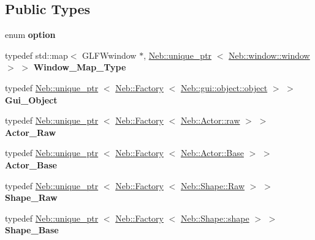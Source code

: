 \subsection*{\-Public \-Types}
\begin{DoxyCompactItemize}
\item 
enum {\bfseries option} 
\item 
\hypertarget{classNeb_1_1master_aeb2db0ac51b05f774e11aa19b9d2ce86}{typedef std\-::map$<$ \-G\-L\-F\-Wwindow \*
$\ast$, \hyperlink{classNeb_1_1unique__ptr}{\-Neb\-::unique\-\_\-ptr}\*
$<$ \hyperlink{classNeb_1_1window_1_1window}{\-Neb\-::window\-::window} $>$ $>$ {\bfseries \-Window\-\_\-\-Map\-\_\-\-Type}}\label{classNeb_1_1master_aeb2db0ac51b05f774e11aa19b9d2ce86}

\item 
\hypertarget{classNeb_1_1master_a1a959eb16f64013e430871c9b8069822}{typedef \hyperlink{classNeb_1_1unique__ptr}{\-Neb\-::unique\-\_\-ptr}\*
$<$ \hyperlink{classNeb_1_1Factory}{\-Neb\-::\-Factory}\*
$<$ \hyperlink{classNeb_1_1gui_1_1object_1_1object}{\-Neb\-::gui\-::object\-::object} $>$ $>$ {\bfseries \-Gui\-\_\-\-Object}}\label{classNeb_1_1master_a1a959eb16f64013e430871c9b8069822}

\item 
\hypertarget{classNeb_1_1master_ac3af757b70b0e360f6edf70403b822c7}{typedef \hyperlink{classNeb_1_1unique__ptr}{\-Neb\-::unique\-\_\-ptr}\*
$<$ \hyperlink{classNeb_1_1Factory}{\-Neb\-::\-Factory}\*
$<$ \hyperlink{classNeb_1_1Actor_1_1raw}{\-Neb\-::\-Actor\-::raw} $>$ $>$ {\bfseries \-Actor\-\_\-\-Raw}}\label{classNeb_1_1master_ac3af757b70b0e360f6edf70403b822c7}

\item 
\hypertarget{classNeb_1_1master_a8dcf02efec834efa24ebb04186809923}{typedef \hyperlink{classNeb_1_1unique__ptr}{\-Neb\-::unique\-\_\-ptr}\*
$<$ \hyperlink{classNeb_1_1Factory}{\-Neb\-::\-Factory}\*
$<$ \hyperlink{classNeb_1_1Actor_1_1Base}{\-Neb\-::\-Actor\-::\-Base} $>$ $>$ {\bfseries \-Actor\-\_\-\-Base}}\label{classNeb_1_1master_a8dcf02efec834efa24ebb04186809923}

\item 
\hypertarget{classNeb_1_1master_a8d33f192971df2a7a14f40ae78868059}{typedef \hyperlink{classNeb_1_1unique__ptr}{\-Neb\-::unique\-\_\-ptr}\*
$<$ \hyperlink{classNeb_1_1Factory}{\-Neb\-::\-Factory}\*
$<$ \hyperlink{classNeb_1_1Shape_1_1Raw}{\-Neb\-::\-Shape\-::\-Raw} $>$ $>$ {\bfseries \-Shape\-\_\-\-Raw}}\label{classNeb_1_1master_a8d33f192971df2a7a14f40ae78868059}

\item 
\hypertarget{classNeb_1_1master_a5769c0b1668ef16b6641e24535fb6f1b}{typedef \hyperlink{classNeb_1_1unique__ptr}{\-Neb\-::unique\-\_\-ptr}\*
$<$ \hyperlink{classNeb_1_1Factory}{\-Neb\-::\-Factory}\*
$<$ \hyperlink{classNeb_1_1Shape_1_1shape}{\-Neb\-::\-Shape\-::shape} $>$ $>$ {\bfseries \-Shape\-\_\-\-Base}}\label{classNeb_1_1master_a5769c0b1668ef16b6641e24535fb6f1b}

\end{DoxyCompactItemize}
